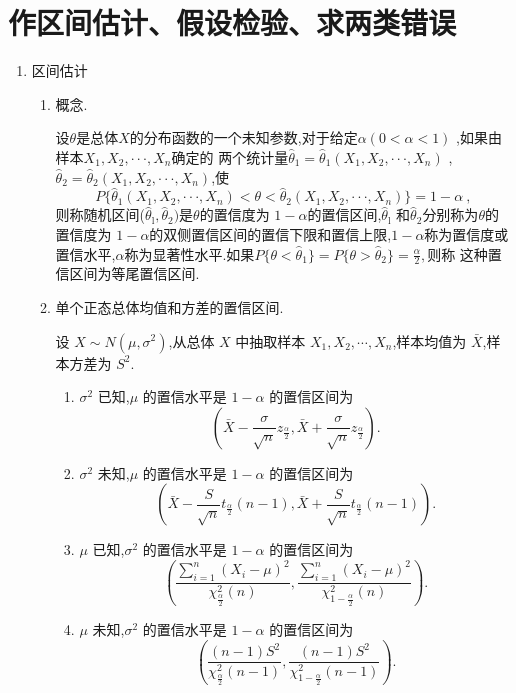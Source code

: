 \section{作区间估计、假设检验、求两类错误}
\begin{enumerate}
      \item 区间估计
            \begin{enumerate}
                  \item 概念.

                        设$\theta$是总体$X$的分布函数的一个未知参数,对于给定$\alpha(0<\alpha<1)$ ,如果由样本$X_1,X_2,\cdotp\cdotp\cdotp,X_n$确定的
                        两个统计量$\hat{\theta } _1= \hat{\theta } _1( X_1, X_2, \cdotp \cdotp \cdotp , X_n)$ , $\hat{\theta } _2= \hat{\theta } _2( X_1, X_2, \cdotp \cdotp \cdotp , X_n)$,使
                        $$P\{\hat{\theta}_1(X_1,X_2,\cdotp\cdotp\cdotp,X_n)<\theta<\hat{\theta}_2(X_1,X_2,\cdotp\cdotp\cdotp,X_n)\}=1-\alpha\:,$$
                        则称随机区间($\hat{\theta}_{\mathrm{l}},\hat{\theta}_{\mathrm{2}})$是$\theta$的置信度为 $1-\alpha$的置信区间,$\hat{\theta}_{\mathrm{l}}$ 和$\hat{\theta}_{\mathrm{2}}$分别称为$\theta$的置信度为 $1-\alpha$的双侧置信区间的置信下限和置信上限,$1-\alpha$称为置信度或置信水平,$\alpha$称为显著性水平.如果$P\{\theta<\hat{\theta}_1\}=P\{\theta>\hat{\theta}_2\}=\frac\alpha2,则称$
                        这种置信区间为等尾置信区间.
                  \item 单个正态总体均值和方差的置信区间.

                        设 $X \sim N(\mu, \sigma^2)$,从总体 $X$ 中抽取样本 $X_1, X_2, \cdots, X_n$,样本均值为 $\bar{X}$,样本方差为 $S^2$.
                        \begin{enumerate}
                              \item  $\sigma^2$ 已知,$\mu$ 的置信水平是 $1-\alpha$ 的置信区间为
                                    $$\left( \bar{X} - \frac{\sigma}{\sqrt{n}} z_{\frac{\alpha}{2}}, \bar{X} + \frac{\sigma}{\sqrt{n}} z_{\frac{\alpha}{2}} \right).$$
                              \item $\sigma^2$ 未知,$\mu$ 的置信水平是 $1-\alpha$ 的置信区间为
                                    $$\left( \bar{X} - \frac{S}{\sqrt{n}} t_{\frac{\alpha}{2}}(n-1), \bar{X} + \frac{S}{\sqrt{n}} t_{\frac{\alpha}{2}}(n-1) \right).$$
                              \item $\mu$ 已知,$\sigma^2$ 的置信水平是 $1-\alpha$ 的置信区间为
                                    $$\left( \frac{\sum_{i=1}^{n} (X_i - \mu)^2}{\chi^2_{\frac{\alpha}{2}}(n)}, \frac{\sum_{i=1}^{n} (X_i - \mu)^2}{\chi^2_{1-\frac{\alpha}{2}}(n)} \right).$$
                              \item $\mu$ 未知,$\sigma^2$ 的置信水平是 $1-\alpha$ 的置信区间为
                                    $$\left( \frac{(n-1)S^2}{\chi^2_{\frac{\alpha}{2}}(n-1)}, \frac{(n-1)S^2}{\chi^2_{1-\frac{\alpha}{2}}(n-1)} \right).$$
                        \end{enumerate}


\end{enumerate}
\end{enumerate}
